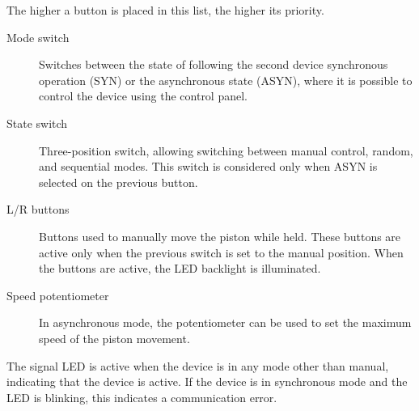 The higher a button is placed in this list, the higher its priority.
\begin{description}
    \item[Mode switch] Switches between the state of following the second device synchronous operation (SYN)  
    or the asynchronous state (ASYN), where it is possible to control the device using the    control panel.
    \item[State switch] Three-position switch, allowing switching between manual control, random, and sequential modes.  
    This switch is considered only when ASYN is selected on the previous button.
    \item[L/R buttons] Buttons used to manually move the piston while held.  
    These buttons are active only when the previous switch is set to the manual position.  
    When the buttons are active, the LED backlight is illuminated.
    \item[Speed potentiometer] In asynchronous mode, the potentiometer can be used to set the maximum speed of the piston movement.
\end{description}
The signal LED is active when the device is in any mode other than manual, indicating that the device is active.  
If the device is in synchronous mode and the LED is blinking, this indicates a communication error.
